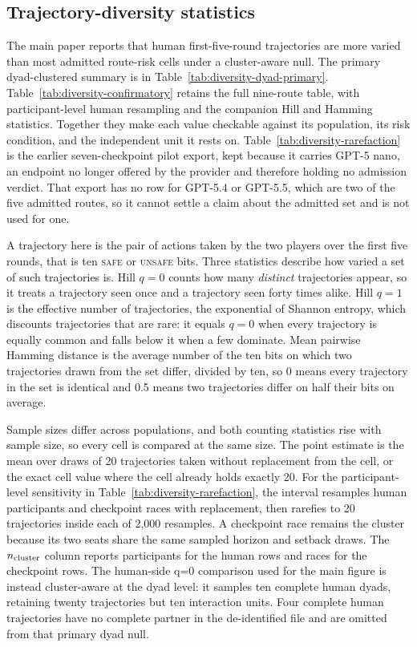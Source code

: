 \documentclass{article}
\newcommand{\Safe}{\textsc{safe}}
\newcommand{\Unsafe}{\textsc{unsafe}}
\begin{document}
\subsection{Trajectory-diversity statistics}
\label{app:diversity}

The main paper reports that human first-five-round trajectories are more
varied than most admitted route-risk cells under a cluster-aware null. The
primary dyad-clustered summary is in Table~\ref{tab:diversity-dyad-primary}.
Table~\ref{tab:diversity-confirmatory} retains the full nine-route table, with
participant-level human resampling and the companion Hill and Hamming
statistics. Together they make each value checkable against its population,
its risk condition, and the independent unit it rests on.
Table~\ref{tab:diversity-rarefaction} is the earlier seven-checkpoint pilot
export, kept because it carries GPT-5 nano, an endpoint no longer offered by
the provider and therefore holding no admission verdict. That export
has no row for GPT-5.4 or GPT-5.5, which are two of the five admitted routes,
so it cannot settle a claim about the admitted set and is not used for one.

A trajectory here is the pair of actions taken by the two players over the
first five rounds, that is ten \Safe{} or \Unsafe{} bits. Three statistics
describe how varied a set of such trajectories is. Hill $q = 0$ counts how
many \emph{distinct} trajectories appear, so it treats a trajectory seen once
and a trajectory seen forty times alike. Hill $q = 1$ is the effective number
of trajectories, the exponential of Shannon entropy, which discounts
trajectories that are rare: it equals $q = 0$ when every trajectory is equally
common and falls below it when a few dominate. Mean pairwise Hamming distance
is the average number of the ten bits on which two trajectories drawn from the
set differ, divided by ten, so 0 means every trajectory in the set is
identical and 0.5 means two trajectories differ on half their bits on average.

Sample sizes differ across populations, and both counting statistics rise with
sample size, so every cell is compared at the same size. The point estimate is
the mean over draws of 20 trajectories taken without replacement from the
cell, or the exact cell value where the cell already holds exactly 20. For the
participant-level sensitivity in Table~\ref{tab:diversity-rarefaction}, the
interval resamples human participants and checkpoint races with replacement,
then rarefies to 20 trajectories inside each of 2{,}000 resamples. A checkpoint
race remains the cluster because its two seats share the same sampled horizon
and setback draws. The $n_{\rm cluster}$ column reports participants for the
human rows and races for the checkpoint rows. The human-side q=0 comparison
used for the main figure is instead cluster-aware at the dyad level: it samples ten
complete human dyads, retaining twenty trajectories but ten interaction units.
Four complete human trajectories have no complete partner in the de-identified
file and are omitted from that primary dyad null.
\end{document}

